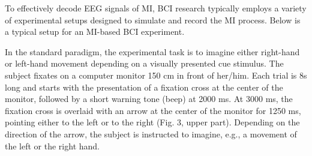 \documentclass[journal,twocolumn]{IEEEtran}
\begin{document}
To effectively decode EEG signals of MI, BCI research typically employs a variety of experimental setups designed to simulate and record the MI process. Below is a typical setup for an MI-based BCI experiment.

In the standard paradigm, the experimental task is to imagine either right-hand or left-hand movement depending on a visually presented cue stimulus. The subject fixates on a computer monitor 150 cm in front of her/him. Each trial is 8s long and starts with the presentation of a fixation cross at the center of the monitor, followed by a short warning tone (beep) at 2000 ms. At 3000 ms, the fixation cross is overlaid with an arrow at the center of the monitor for 1250 ms, pointing either to the left or to the right (Fig. 3, upper part). Depending on the direction of the arrow, the subject is instructed to imagine, e.g., a movement of the left or the right hand.
\end{document}
